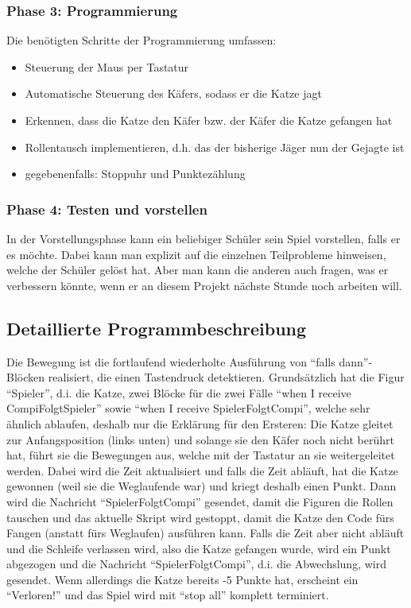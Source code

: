 \subsubsection{Phase 3: Programmierung}\label{phase-3-programmierung}

Die benötigten Schritte der Programmierung umfassen:

\begin{itemize}
\item
  Steuerung der Maus per Tastatur
\item
  Automatische Steuerung des Käfers, sodass er die Katze jagt
\item
  Erkennen, dass die Katze den Käfer bzw. der Käfer die Katze gefangen
  hat
\item
  Rollentausch implementieren, d.h. das der bisherige Jäger nun der
  Gejagte ist
\item
  gegebenenfalls: Stoppuhr und Punktezählung
\end{itemize}

\subsubsection{Phase 4: Testen und
vorstellen}\label{phase-4-testen-und-vorstellen}

In der Vorstellungsphase kann ein beliebiger Schüler sein Spiel
vorstellen, falls er es möchte. Dabei kann man explizit auf die
einzelnen Teilprobleme hinweisen, welche der Schüler gelöst hat. Aber
man kann die anderen auch fragen, was er verbessern könnte, wenn er an
diesem Projekt nächste Stunde noch arbeiten will.

\subsection{Detaillierte
Programmbeschreibung}\label{detaillierte-programmbeschreibung}

Die Bewegung ist die fortlaufend wiederholte Ausführung von ``falls
dann''-Blöcken realisiert, die einen Tastendruck detektieren.
Grundsätzlich hat die Figur ``Spieler'', d.i. die Katze, zwei Blöcke für
die zwei Fälle ``when I receive CompiFolgtSpieler'' sowie ``when I
receive SpielerFolgtCompi'', welche sehr ähnlich ablaufen, deshalb nur
die Erklärung für den Ersteren: Die Katze gleitet zur Anfangsposition
(links unten) und solange sie den Käfer noch nicht berührt hat, führt
sie die Bewegungen aus, welche mit der Tastatur an sie weitergeleitet
werden. Dabei wird die Zeit aktualisiert und falls die Zeit abläuft, hat
die Katze gewonnen (weil sie die Weglaufende war) und kriegt deshalb
einen Punkt. Dann wird die Nachricht ``SpielerFolgtCompi'' gesendet,
damit die Figuren die Rollen tauschen und das aktuelle Skript wird
gestoppt, damit die Katze den Code fürs Fangen (anstatt fürs Weglaufen)
ausführen kann. Falls die Zeit aber nicht abläuft und die Schleife
verlassen wird, also die Katze gefangen wurde, wird ein Punkt abgezogen
und die Nachricht ``SpielerFolgtCompi'', d.i. die Abwechslung, wird
gesendet. Wenn allerdings die Katze bereits -5 Punkte hat, erscheint ein
``Verloren!'' und das Spiel wird mit ``stop all'' komplett terminiert.

